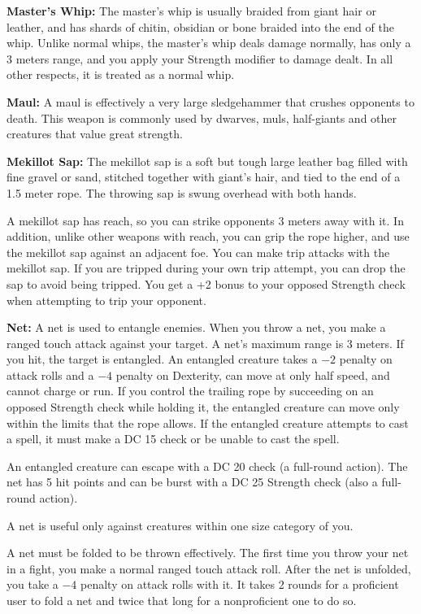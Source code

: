 \textbf{Master's Whip:} The master's whip is usually braided from giant hair or leather, and has shards of chitin, obsidian or bone braided into the end of the whip. Unlike normal whips, the master's whip deals damage normally, has only a 3 meters range, and you apply your Strength modifier to damage dealt. In all other respects, it is treated as a normal whip.

\textbf{Maul:} A maul is effectively a very large sledgehammer that crushes opponents to death. This weapon is commonly used by dwarves, muls, half-giants and other creatures that value great strength.

\textbf{Mekillot Sap:} The mekillot sap is a soft but tough large leather bag filled with fine gravel or sand, stitched together with giant's hair, and tied to the end of a 1.5 meter rope. The throwing sap is swung overhead with both hands.

A mekillot sap has reach, so you can strike opponents 3 meters away with it. In addition, unlike other weapons with reach, you can grip the rope higher, and use the mekillot sap against an adjacent foe. You can make trip attacks with the mekillot sap. If you are tripped during your own trip attempt, you can drop the sap to avoid being tripped. You get a +2 bonus to your opposed Strength check when attempting to trip your opponent.

\textbf{Net:} A net is used to entangle enemies. When you throw a net, you make a ranged touch attack against your target. A net's maximum range is 3 meters. If you hit, the target is entangled. An entangled creature takes a $-2$ penalty on attack rolls and a $-4$ penalty on Dexterity, can move at only half speed, and cannot charge or run. If you control the trailing rope by succeeding on an opposed Strength check while holding it, the entangled creature can move only within the limits that the rope allows. If the entangled creature attempts to cast a spell, it must make a DC 15  check or be unable to cast the spell.

An entangled creature can escape with a DC 20  check (a full-round action). The net has 5 hit points and can be burst with a DC 25 Strength check (also a full-round action).

A net is useful only against creatures within one size category of you.

A net must be folded to be thrown effectively. The first time you throw your net in a fight, you make a normal ranged touch attack roll. After the net is unfolded, you take a $-4$ penalty on attack rolls with it. It takes 2 rounds for a proficient user to fold a net and twice that long for a nonproficient one to do so. 

